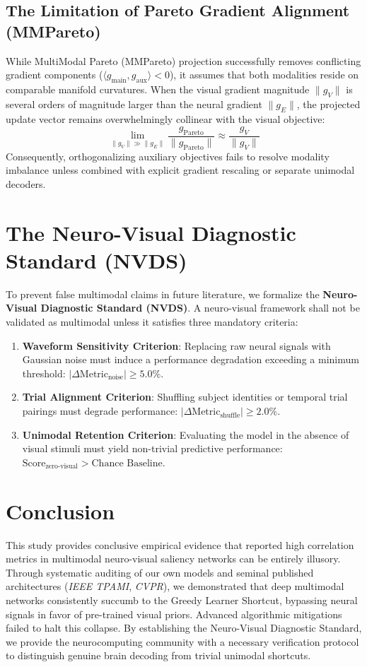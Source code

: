 \documentclass[journal,twocolumn]{IEEEtran}
\begin{document}
\subsection{The Limitation of Pareto Gradient Alignment (MMPareto)}
While MultiModal Pareto (MMPareto) projection successfully removes conflicting gradient components ($\langle g_{\text{main}}, g_{\text{aux}} \rangle < 0$), it assumes that both modalities reside on comparable manifold curvatures. When the visual gradient magnitude $\|g_V\|$ is several orders of magnitude larger than the neural gradient $\|g_E\|$, the projected update vector remains overwhelmingly collinear with the visual objective:
\begin{equation}
\lim_{\|g_V\| \gg \|g_E\|} \frac{g_{\text{Pareto}}}{\|g_{\text{Pareto}}\|} \approx \frac{g_V}{\|g_V\|}
\end{equation}
Consequently, orthogonalizing auxiliary objectives fails to resolve modality imbalance unless combined with explicit gradient rescaling or separate unimodal decoders.

\section{The Neuro-Visual Diagnostic Standard (NVDS)}
To prevent false multimodal claims in future literature, we formalize the \textbf{Neuro-Visual Diagnostic Standard (NVDS)}. A neuro-visual framework shall not be validated as multimodal unless it satisfies three mandatory criteria:
\begin{enumerate}
    \item \textbf{Waveform Sensitivity Criterion}: Replacing raw neural signals with Gaussian noise must induce a performance degradation exceeding a minimum threshold: $|\Delta \text{Metric}_{\text{noise}}| \ge 5.0\%$.
    \item \textbf{Trial Alignment Criterion}: Shuffling subject identities or temporal trial pairings must degrade performance: $|\Delta \text{Metric}_{\text{shuffle}}| \ge 2.0\%$.
    \item \textbf{Unimodal Retention Criterion}: Evaluating the model in the absence of visual stimuli must yield non-trivial predictive performance: $\text{Score}_{\text{zero-visual}} > \text{Chance Baseline}$.
\end{enumerate}

\section{Conclusion}
This study provides conclusive empirical evidence that reported high correlation metrics in multimodal neuro-visual saliency networks can be entirely illusory. Through systematic auditing of our own models and seminal published architectures (\textit{IEEE TPAMI}, \textit{CVPR}), we demonstrated that deep multimodal networks consistently succumb to the Greedy Learner Shortcut, bypassing neural signals in favor of pre-trained visual priors. Advanced algorithmic mitigations failed to halt this collapse. By establishing the Neuro-Visual Diagnostic Standard, we provide the neurocomputing community with a necessary verification protocol to distinguish genuine brain decoding from trivial unimodal shortcuts.
\end{document}
